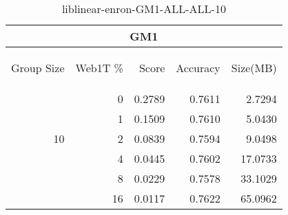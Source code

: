 \begin{center}
\begin{table}[htbp] 
 \begin{center}
\begin{tabular}{ | r | r | r | r | r |}
\hline
\multicolumn{5}{|c|}{GM1}\\
\hline
\begin{sideways}Group Size\end{sideways} & \begin{sideways}Web1T \%\end{sideways} & \begin{sideways}Score\end{sideways} & \begin{sideways}Accuracy\end{sideways} & \begin{sideways}Size(MB)\end{sideways}\\
\hline
\multirow{5}{*}{10}
 & 0 & 0.2789 & 0.7611 & 2.7294\\ \cline{2-5}
 & 1 & 0.1509 & 0.7610 & 5.0430\\ \cline{2-5}
 & 2 & 0.0839 & 0.7594 & 9.0498\\ \cline{2-5}
 & 4 & 0.0445 & 0.7602 & 17.0733\\ \cline{2-5}
 & 8 & 0.0229 & 0.7578 & 33.1029\\ \cline{2-5}
 & 16 & 0.0117 & 0.7622 & 65.0962\\ \cline{2-5}
\hline
\end{tabular}
\caption{liblinear-enron-GM1-ALL-ALL-10}
\label{table:liblinear-enron-GM1-ALL-ALL-10}
\end{center}
 \end{table}
\end{center}

